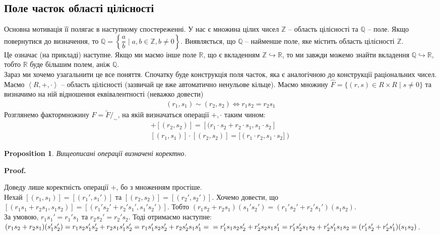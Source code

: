 \documentclass[a4paper, 10pt]{article}
\makeatletter
\theoremstyle{theoremdd}
\theoremstyle{theoremdd}
\theoremstyle{theoremdd}
\theoremstyle{theoremdd}
\theoremstyle{theoremdd}
\theoremstyle{theoremdd}
\theoremstyle{theoremdd}
\theoremstyle{theoremdd}
\theoremstyle{theoremdd}
\newtheorem{proposition}[theorem]{Proposition}
\theoremstyle{theoremdd}
\theoremstyle{theoremdd}
\theoremstyle{theoremdd}
\theoremstyle{theoremdd}
\theoremstyle{theoremdd}
\theoremstyle{theoremdd}
\renewenvironment{proof}[1][Proof.\\]{\par
\pushQED{\hfill \qed}%
\normalfont \topsep6\p@\@plus6\p@\relax
\trivlist
\item\relax
{\bfseries
#1\@addpunct{.}}\hspace\labelsep\ignorespaces
}{%
\popQED\endtrivlist\@endpefalse
}
\makeatother
\begin{document}
\subsection{Поле часток області цілісності}
Основна мотивація її полягає в наступному спостереженні. У нас є множина цілих чисел $\mathbb{Z}$ -- область цілісності та $\mathbb{Q}$ -- поле. Якщо повернутися до визначення, то $\mathbb{Q} = \left\{ \dfrac{a}{b} \mid a,b \in \mathbb{Z}, b \neq 0 \right\}$. Виявляється, що $\mathbb{Q}$ -- найменше поле, яке містить область цілісності $\mathbb{Z}$.\\
Це означає (на прикладі) наступне. Якщо ми маємо інше поле $\mathbb{R}$, що є вкладенням $\mathbb{Z} \hookrightarrow \mathbb{R}$, то ми завжди можемо знайти вкладення $\mathbb{Q} \hookrightarrow \mathbb{R}$, тобто $\mathbb{R}$ буде більшим полем, аніж $\mathbb{Q}$.\\
Зараз ми хочемо узагальнити це все поняття. Спочатку буде конструкція поля часток, яка є аналогічною до конструкції раціональних чисел.
\bigskip \\
Маємо $\left<R,+,\cdot\right>$ -- область цілісності (зазвичай це вже автоматично ненульове кільце). Маємо множину $\hat{F} = \{ (r,s) \in R \times R \mid s \neq 0 \}$ та визначимо на ній відношення еквівалентності (неважко довести)
\begin{align*}
(r_1,s_1) \sim (r_2,s_2) \iff r_1 s_2 = r_2 s_1
\end{align*}
Розглянемо фактормножину $F = \tilde{F}/_{\sim}$, на якій визначаться операції $+,\cdot$ таким чином:
\begin{align*}
[(r_1,s_1)] + [(r_2,s_2)] = [(r_1 \cdot s_2 + r_2 \cdot s_1, s_1 \cdot s_2] \\
[(r_1,s_1)] \cdot [(r_2,s_2)] = [(r_1 \cdot r_2, s_1 \cdot s_2])
\end{align*}

\begin{proposition}
Вищеописані операції визначені коректно.
\end{proposition}

\begin{proof}
Доведу лише коректність операції $+$, бо з множенням простіше.\\
Нехай $[(r_1,s_1)] = [(r_1',s_1')]$ та $[(r_2,s_2)] = [(r_2',s_2')]$. Хочемо довести, що \\ $[(r_1s_1 + r_2s_1, s_1s_2)] = [(r_1's_2' + r_2's_1', s_1's_2')]$. Тобто $(r_1 s_2 + r_2 s_1)(s_1' s_2') = (r_1' s_2' + r_2's_1') (s_1s_2)$.\\
За умовою, $r_1s_1' = r_1's_1$ та $r_2s_2' = r_2' s_2$. Тоді отримаємо наступне:\\
$(r_1 s_2 + r_2 s_1) (s_1' s_2') = r_1 s_2 s_1' s_2' + r_2 s_1 s_1' s_2' = r_1 s_1' s_2 s_2' + r_2 s_2' s_1 s_1' = \\
= r_1' s_1 s_2 s_2' + r_2' s_2 s_1 s_1' = r_1' s_2' s_1 s_2 + r_2' s_1' s_1 s_2 = (r_1' s_2' + r_2' s_1') (s_1 s_2)$.
\end{proof}
\end{document}
